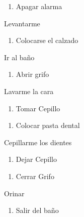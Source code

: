 \item
  \begin{enumerate}
  \def\labelenumii{\arabic{enumii}.}
  \setcounter{enumii}{1}
  \tightlist
  \item
    Apagar alarma
  \end{enumerate}
\item
  Levantarme
\item
  \begin{enumerate}
  \def\labelenumii{\arabic{enumii}.}
  \tightlist
  \item
    Colocarse el calzado
  \end{enumerate}
\item
  Ir al baño
\item
  \begin{enumerate}
  \def\labelenumii{\arabic{enumii}.}
  \tightlist
  \item
    Abrir grifo
  \end{enumerate}
\item
  Lavarme la cara
\item
  \begin{enumerate}
  \def\labelenumii{\arabic{enumii}.}
  \tightlist
  \item
    Tomar Cepillo
  \end{enumerate}
\item
  \begin{enumerate}
  \def\labelenumii{\arabic{enumii}.}
  \setcounter{enumii}{1}
  \tightlist
  \item
    Colocar pasta dental
  \end{enumerate}
\item
  Cepillarme los dientes
\item
  \begin{enumerate}
  \def\labelenumii{\arabic{enumii}.}
  \tightlist
  \item
    Dejar Cepillo
  \end{enumerate}
\item
  \begin{enumerate}
  \def\labelenumii{\arabic{enumii}.}
  \setcounter{enumii}{1}
  \tightlist
  \item
    Cerrar Grifo
  \end{enumerate}
\item
  Orinar
\item
  \begin{enumerate}
  \def\labelenumii{\arabic{enumii}.}
  \tightlist
  \item
    Salir del baño
  \end{enumerate}
